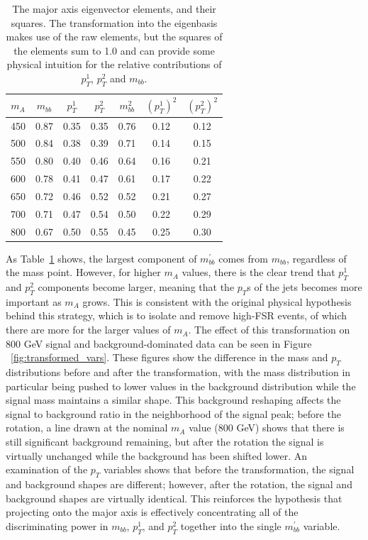 \begin{table}
    \caption{The major axis eigenvector elements, and their squares.  The
    transformation into the eigenbasis makes use of the raw elements, but the
    squares of the elements sum to 1.0 and can provide some physical intuition
    for the relative contributions of $p_T^1$, $p_T^2$ and $m_{bb}$. \label{tab:eigenvector_elements}}
    \begin{tabular}{ c c c c c c c } \hline \hline
        $m_A$ & $m_{bb}$ & $p_T^1$ & $p_T^2$ & $m_{bb}^2$ & $(p_T^{1})^2$ & $(p_T^2)^2$ \\ \hline
        450 & 0.87 & 0.35 & 0.35 & 0.76 & 0.12 & 0.12 \\
        500 & 0.84 & 0.38 & 0.39 & 0.71 & 0.14 & 0.15 \\
        550 & 0.80 & 0.40 & 0.46 & 0.64 & 0.16 & 0.21 \\
        600 & 0.78 & 0.41 & 0.47 & 0.61 & 0.17 & 0.22 \\
        650 & 0.72 & 0.46 & 0.52 & 0.52 & 0.21 & 0.27 \\
        700 & 0.71 & 0.47 & 0.54 & 0.50 & 0.22 & 0.29 \\
        800 & 0.67 & 0.50 & 0.55 & 0.45 & 0.25 & 0.30 \\ 
        \hline
    \end{tabular}
\end{table} 

As Table~\ref{tab:eigenvector_elements} shows, the largest component of
$m_{bb}^{'}$ comes from $m_{bb}$, regardless of the mass point.  However,
for higher $m_A$ values, there is the clear trend that $p_T^1$ and $p_T^2$
components become larger, meaning that the $p_T$s of the jets becomes 
more important as $m_A$ grows.  This is consistent with the original 
physical hypothesis behind this strategy, which is to isolate and remove
high-FSR events, of which there are more for the larger values of $m_A$. 
The effect of this transformation on 800 GeV signal and background-dominated
data can be seen in Figure ~\ref{fig:transformed_vars}.  These figures show
the difference in the mass and $p_T$ distributions before and after the transformation,
with the mass distribution in particular being pushed to lower values
in the background distribution while the signal mass maintains a similar shape.  
This background reshaping affects the signal to background ratio in the 
neighborhood of the signal peak; before the rotation,
a line drawn at the nominal $m_A$ value (800 GeV) shows that there is still
significant background remaining, but after the rotation the signal is virtually
unchanged while the background has been shifted lower.  An examination of the
$p_T$ variables shows that before the transformation, the signal and background
shapes are different; however, after the rotation, the signal and background
shapes are virtually identical.  This reinforces the hypothesis that projecting
onto the major axis is effectively concentrating all of the discriminating 
power in $m_{bb}$, $p_T^1$, and $p_T^2$ together into the single $m_{bb}^{'}$
variable.  

